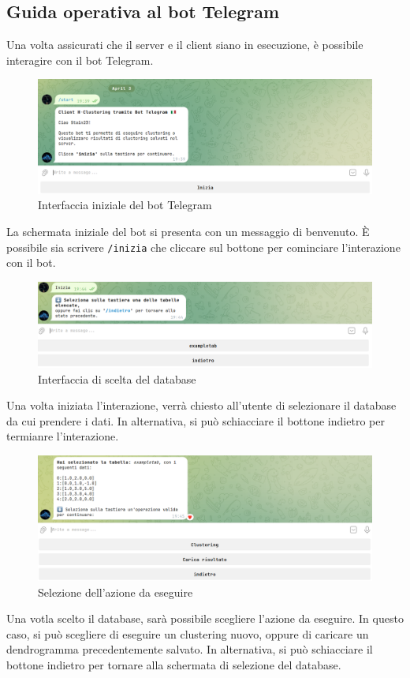 \subsection{Guida operativa al bot Telegram}

Una volta assicurati che il server e il client siano in esecuzione, è possibile interagire con il bot Telegram.


\begin{figure}
    \centering
    \includegraphics[width=.5\textwidth]{images/tg iniziale.png}
    \caption{Interfaccia iniziale del bot Telegram}
\end{figure}

La schermata iniziale del bot si presenta con un messaggio di benvenuto. È possibile sia scrivere \texttt{/inizia} che cliccare sul bottone per cominciare l'interazione con il bot.

\begin{figure}
    \centering
    \includegraphics[width=.5\textwidth]{images/inizia tg.png}
    \caption{Interfaccia di scelta del database}
\end{figure}

Una volta iniziata l'interazione, verrà chiesto all'utente di selezionare il database da cui prendere i dati. In alternativa, si può schiacciare il bottone indietro per termianre l'interazione. 

\begin{figure}
    \centering
    \includegraphics[width=.5\textwidth]{images/tg schemrata clustering.png}
    \caption{Selezione dell'azione da eseguire}
\end{figure}

Una votla scelto il database, sarà possibile scegliere l'azione da eseguire. In questo caso, si può scegliere di eseguire un clustering nuovo, oppure di caricare un dendrogramma precedentemente salvato. In alternativa, si può schiacciare il bottone indietro per tornare alla schermata di selezione del database.

